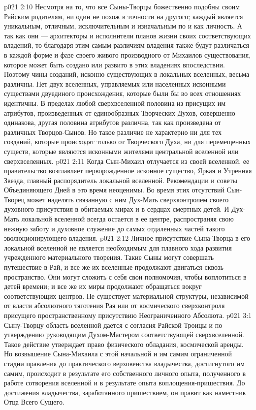 \vs p021 2:10 Несмотря на то, что все Сыны\hyp{}Творцы божественно подобны своим Райским родителям, ни один не похож в точности на другого; каждый является уникальным, отличным, исключительным и изначальным по  и как личность. А так как они --- архитекторы и исполнители планов жизни своих соответствующих владений, то благодаря этим самым различиям владения также будут различаться в каждой форме и фазе своего живого производного от Михаилов существования, которое может быть создано или развито в этих владениях впоследствии. Поэтому чины созданий, исконно существующих в локальных вселенных, весьма различны. Нет двух вселенных, управляемых или населенных исконными существами двуединого происхождения, которые были бы во всех отношениях идентичны. В пределах любой сверхвселенной половина из присущих им атрибутов, произведенных от единообразных Творческих Духов, совершенно одинакова, другая половина атрибутов различна, так как произведена от различных Творцов\hyp{}Сынов. Но такое различие не характерно ни для тех созданий, которые происходят только от Творческого Духа, ни для перемещенных существ, которые являются исконными жителями центральной вселенной или сверхвселенных.
\vs p021 2:11 \pc Когда Сын\hyp{}Михаил отлучается из своей вселенной, ее правительство возглавляет перворожденное исконное существо, Яркая и Утренняя Звезда, главный распорядитель локальной вселенной. Рекомендации и советы Объединяющего Дней в это время неоценимы. Во время этих отсутствий Сын\hyp{}Творец может наделять связанную с ним Дух\hyp{}Мать сверхконтролем своего духовного присутствия в обитаемых мирах и в сердцах смертных детей. И Дух\hyp{}Мать локальной вселенной всегда остается в ее центре, распространяя свою нежную заботу и духовное служение до самых отдаленных частей такого эволюционирующего владения.
\vs p021 2:12 Личное присутствие Сына\hyp{}Творца в его локальной вселенной не является необходимым для плавного хода развития учрежденного материального творения. Такие Сыны могут совершать путешествие в Рай, и все же их вселенные продолжают двигаться сквозь пространство. Они могут сложить с себя свои полномочия, чтобы воплотиться в детей времени; и все же их миры продолжают обращаться вокруг соответствующих центров. Не существует материальной структуры, независимой от власти абсолютного тяготения Рая или от космического сверхконтроля присущего пространственному присутствию Неограниченного Абсолюта.
\vs p021 3:1 Сыну\hyp{}Творцу область вселенной дается с согласия Райской Троицы и по утверждению руководящим Духом\hyp{}Мастером соответствующей сверхвселенной. Такое действие утверждает право физического обладания, космической аренды. Но возвышение Сына\hyp{}Михаила с этой начальной и им самим ограниченной стадии правления до практического верховенства владычества, достигнутого им самим, происходит в результате его собственного личного опыта, полученного в работе сотворения вселенной и в результате опыта воплощения\hyp{}пришествия. До достижения владычества, заработанного пришествием, он правит как наместник Отца Всего Сущего.
